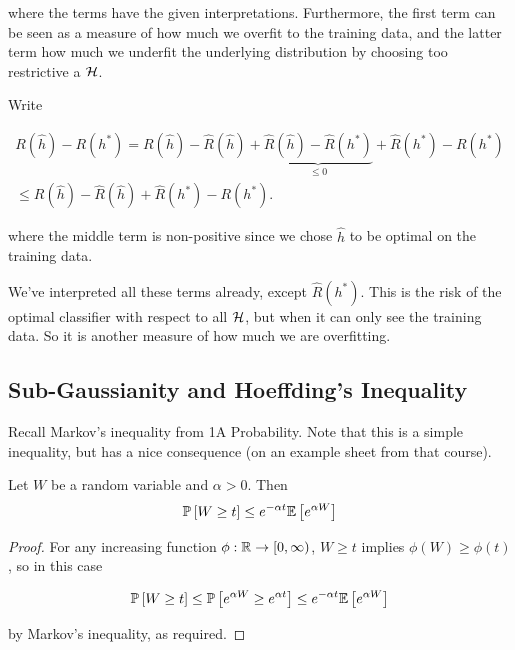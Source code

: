 \documentclass[11pt]{scrartcl}
\begin{document}
where the terms have the given interpretations. Furthermore, the first term can be seen as a measure of how much we overfit to the training data, and the latter term how much we underfit the underlying distribution by choosing too restrictive a $\mathcal{H}$.




Write 

\begin{align}
    R(\hat{h}) - R(h^*) = R(\hat{h}) - \hat{R}(\hat{h}) + \underbrace{\hat{R}(\hat{h}) - \hat{R}(h^*)}_{\le 0} + \hat{R}(h^*) - R(h^*) \\
    \le R(\hat{h}) - \hat{R}(\hat{h}) + \hat{R}(h^*) - R(h^*).
\end{align}

where the middle term is non-positive since we chose $\hat{h}$ to be optimal on the training data.

We've interpreted all these terms already, except $\hat{R}(h^*)$. This is the risk of the optimal classifier with respect to all $\mathcal{H}$, but when it can only see the training data. So it is another measure of how much we are overfitting.

\subsection{Sub-Gaussianity and Hoeffding's Inequality}

Recall Markov's inequality from 1A Probability. Note that this is a simple inequality, but has a nice consequence (on an example sheet from that course).

\begin{theorem}
Let $W$ be a random variable and $\alpha > 0$. Then
\begin{equation}
    \mathbb{P} \left[ W \ge t \right] \le e^{- \alpha t} \mathbb{E} \left[ e^{\alpha W} \right]
\label{L2 Chernoff}
\end{equation}

\begin{proof}

For any increasing function $\phi : \mathbb R \rightarrow [0, \infty)$, $W \ge t$ implies $\phi(W) \ge \phi(t)$, so in this case

\begin{equation}
    \mathbb{P} \left[ W \ge t \right] \le \mathbb{P} \left[ e^{\alpha W} \ge e^{\alpha t} \right] \le e^{- \alpha t} \mathbb{E} \left[ e^{\alpha W} \right]
\end{equation}

by Markov's inequality, as required.
\end{proof}
\end{theorem}
\end{document}
